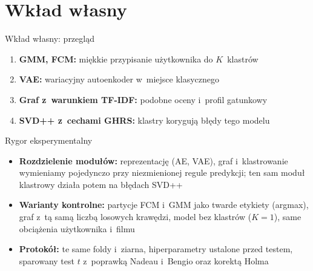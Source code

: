 \documentclass[red]{beamer}
\begin{document}
    \section{Wkład własny}
    \begin{frame}{Wkład własny: przegląd}
        \small
        \begin{enumerate}
            \item \textbf{GMM, FCM:} miękkie przypisanie użytkownika do $K$~klastrów
            \item \textbf{VAE:} wariacyjny autoenkoder w~miejsce klasycznego
            \item \textbf{Graf z~warunkiem TF-IDF:} podobne oceny i~profil gatunkowy
            \item \textbf{SVD++ z~cechami GHRS:} klastry korygują błędy tego modelu
        \end{enumerate}
        \begin{block}{Rygor eksperymentalny}
            \footnotesize
            \begin{itemize}
                \item \textbf{Rozdzielenie modułów:} reprezentację (AE, VAE), graf
                      i~klastrowanie wymieniamy pojedynczo przy niezmienionej regule
                      predykcji; ten sam moduł klastrowy działa potem na błędach SVD++
                \item \textbf{Warianty kontrolne:} partycje FCM i~GMM jako twarde etykiety
                      (argmax), graf z~tą samą liczbą losowych krawędzi, model bez klastrów
                      ($K = 1$), same obciążenia użytkownika i~filmu
                \item \textbf{Protokół:} te same foldy i~ziarna, hiperparametry ustalone
                      przed testem, sparowany test $t$ z~poprawką Nadeau i~Bengio oraz
                      korektą Holma
            \end{itemize}
        \end{block}
    \end{frame}
\end{document}
